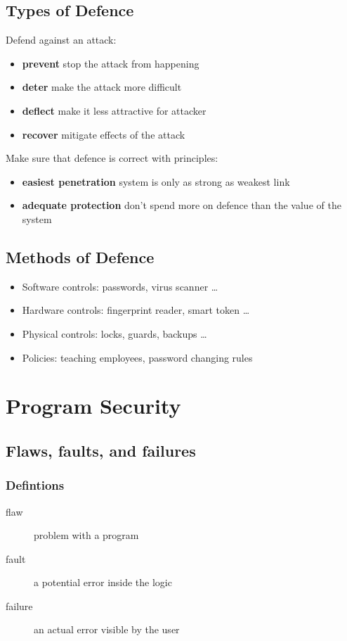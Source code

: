 \documentclass[]{article}
\theoremstyle{definition}
\begin{document}
	\subsection{Types of Defence}
	Defend against an attack:
	\begin{itemize}
		\item \textbf{prevent} stop the attack from happening
		\item \textbf{deter} make the attack more difficult
		\item \textbf{deflect} make it less attractive for attacker
		\item \textbf{recover} mitigate effects of the attack
	\end{itemize}

	Make sure that defence is correct with principles:
	\begin{itemize}
		\item \textbf{easiest penetration} system is only as strong as weakest link
		\item \textbf{adequate protection} don't spend more on defence than the value of the system
	\end{itemize}

	\subsection{Methods of Defence}
	\begin{itemize}
		\item Software controls: passwords, virus scanner \dots
		\item Hardware controls: fingerprint reader, smart token \dots
		\item Physical controls: locks, guards, backups \dots
		\item Policies: teaching employees, password changing rules
	\end{itemize}


	\section{Program Security}
	\subsection{Flaws, faults, and failures}
	\subsubsection{Defintions}
	\begin{description}
		\item[flaw] problem with a program
		\item[fault] a potential error inside the logic
		\item[failure] an actual error visible by the user
	\end{description}
\end{document}
